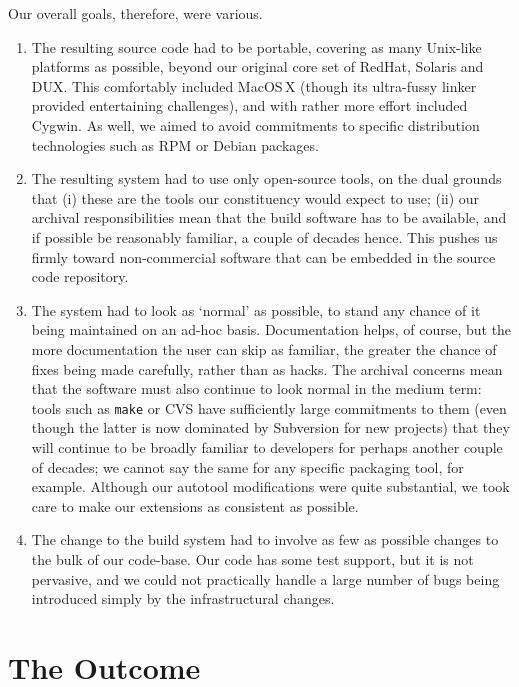 \documentclass{speauth}
\begin{document}
Our overall goals, therefore, were various.
\begin{enumerate}
\item \label{it:portable}The resulting source code had to be portable,
  covering as many Unix-like platforms as possible, beyond our
  original core set of RedHat, Solaris and DUX.  This comfortably
  included MacOS\,X (though its ultra-fussy linker provided
  entertaining challenges), and with rather more effort included
  Cygwin.  As well, we aimed to avoid commitments to specific
  distribution technologies such as RPM or Debian packages.
\item The resulting system had to use only open-source tools, on the
  dual grounds that
  (i) these are the tools our constituency would expect to use;
  (ii) our archival responsibilities mean that the build software has
  to be available, and if possible be reasonably familiar, a couple of decades
  hence.  This pushes us firmly toward non-commercial
  software that can be embedded in the source code repository.
\item \label{it:normal} The system had to look as `normal' as
  possible, to stand any chance of it being maintained on an ad-hoc
  basis.  Documentation helps, of course, but the more documentation
  the user can skip as familiar, the greater the chance of fixes being
  made carefully, rather than as hacks.  The archival concerns mean
  that the software must also continue to look normal in the medium
  term: tools such as \texttt{make} or CVS have sufficiently large
  commitments to them (even though the latter is now dominated by
  Subversion for new projects) that they will continue to be broadly
  familiar to developers for perhaps another couple of decades; we
  cannot say the same for any specific packaging tool, for example.
  Although our autotool modifications were quite substantial, we took
  care to make our extensions as consistent as possible.
\item The change to the build system had to involve as few as possible
  changes to the bulk of our code-base.  Our code has some test
  support, but it is not pervasive, and we could not practically
  handle a large number of bugs being introduced simply by the
  infrastructural changes.
\end{enumerate}


\section{The Outcome}
\label{s:result}
\end{document}
